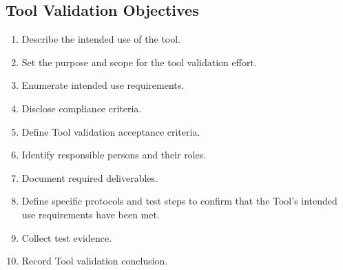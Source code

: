 \subsection{Tool Validation Objectives}
\begin{enumerate}
  \item Describe the intended use of the tool.
  \item Set the purpose and scope for the tool validation effort.
  \item Enumerate intended use requirements.
  \item Disclose compliance criteria.
  \item Define Tool validation acceptance criteria.
  \item Identify responsible persons and their roles.
  \item Document required deliverables.
  \item Define specific protocols and test steps to confirm that the Tool's
    intended use requirements have been met.
  \item Collect test evidence.
  \item Record Tool validation conclusion.
\end{enumerate}
